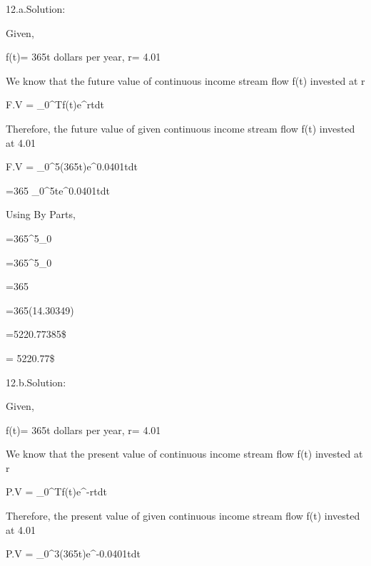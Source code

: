 
12.a.Solution:



Given,


\tiny f(t)= 365t \:\textup{ dollars per year}, r= 4.01%


We know that the future value of continuous income stream flow f(t) invested at r%


\tiny F.V = \int_{0}^{T}f(t)e^{rt}dt


Therefore, the future value of given continuous income stream flow f(t) invested at 4.01%


\tiny F.V = \int_{0}^{5}(365t)e^{0.0401t}dt



          \tiny =365 \int _0^5te^{0.0401t}dt



Using By Parts,



         \tiny =365^5_0



        \tiny =365\left[24.93765t e^{0.0401t}-621.88638 e^{0.0401t}\right]^5_0



      \tiny =365\left[24.93765(5)e^{0.0401(0)}-621.88638 e^{0.0401(0)}\right]




\tiny =365\:(14.30349)



\tiny =5220.77385\:\$



\tiny ={\color{Red} 5220.77\:\$}





12.b.Solution:


Given,


\tiny f(t)= 365t \:\textup{ dollars per year}, r= 4.01%


We know that the present value of continuous income stream flow f(t) invested at r%


\tiny P.V = \int_{0}^{T}f(t)e^{-rt}dt


Therefore, the present value of given continuous income stream flow f(t) invested at 4.01%


\tiny P.V = \int_{0}^{3}(365t)e^{-0.0401t}dt




